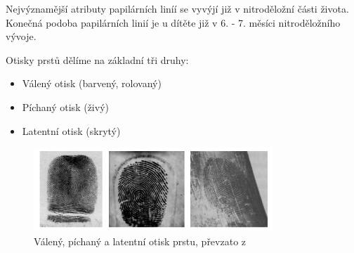 Nejvýznamější atributy papilárních liníí se vyvýjí již v nitroděložní části života. Konečná podoba papilárních linií je u dítěte již v 6. - 7. měsíci nitroděložního vývoje.\cite{DrahanskyBrezinova}

Otisky prstů dělíme na základní tři druhy:\cite{Drahansky}
\begin{itemize}
\item Válený otisk (barvený, rolovaný)
\item Píchaný otisk (živý)
\item Latentní otisk (skrytý)
\end{itemize}

\begin{figure}[htbp]
    \centering
    \includegraphics[width=340]{obrazky-figures/druhyotisk.png}
    \caption{Válený, píchaný a latentní otisk prstu, převzato z \cite{Drahansky}}
    \label{fig:druhyotisk}
\end{figure}

